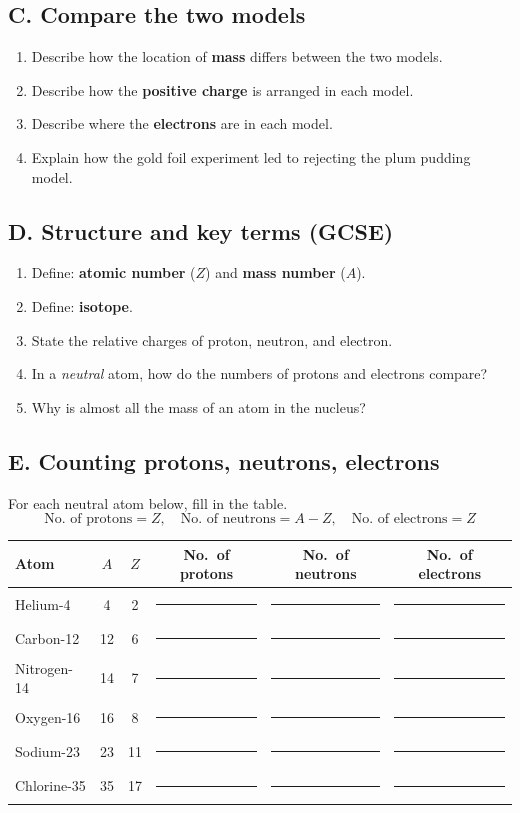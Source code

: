 \documentclass[11pt,a4paper]{article}
\begin{document}
\subsection*{C. Compare the two models}
\begin{enumerate}[resume]
  \item Describe how the location of \textbf{mass} differs between the two models.
  \item Describe how the \textbf{positive charge} is arranged in each model.
  \item Describe where the \textbf{electrons} are in each model.
  \item Explain how the gold foil experiment led to rejecting the plum pudding model.
\end{enumerate}

\subsection*{D. Structure and key terms (GCSE)}
\begin{enumerate}[resume]
  \item Define: \textbf{atomic number} ($Z$) and \textbf{mass number} ($A$).
  \item Define: \textbf{isotope}.
  \item State the relative charges of proton, neutron, and electron.
  \item In a \emph{neutral} atom, how do the numbers of protons and electrons compare?
  \item Why is almost all the mass of an atom in the nucleus?
\end{enumerate}

\newpage
\subsection*{E. Counting protons, neutrons, electrons}
For each neutral atom below, fill in the table.
\[
\text{No.\ of protons} = Z,\quad
\text{No.\ of neutrons} = A-Z,\quad
\text{No.\ of electrons} = Z
\]

\begin{center}
\begin{tabular}{@{}lccccc@{}}
\toprule
Atom & $A$ & $Z$ & No.\ of protons & No.\ of neutrons & No.\ of electrons \\
\midrule
Helium-4      & 4  & 2  & \rule{1cm}{0.4pt} & \rule{1cm}{0.4pt} & \rule{1cm}{0.4pt} \\
Carbon-12     & 12 & 6  & \rule{1cm}{0.4pt} & \rule{1cm}{0.4pt} & \rule{1cm}{0.4pt} \\
Nitrogen-14   & 14 & 7  & \rule{1cm}{0.4pt} & \rule{1cm}{0.4pt} & \rule{1cm}{0.4pt} \\
Oxygen-16     & 16 & 8  & \rule{1cm}{0.4pt} & \rule{1cm}{0.4pt} & \rule{1cm}{0.4pt} \\
Sodium-23     & 23 & 11 & \rule{1cm}{0.4pt} & \rule{1cm}{0.4pt} & \rule{1cm}{0.4pt} \\
Chlorine-35   & 35 & 17 & \rule{1cm}{0.4pt} & \rule{1cm}{0.4pt} & \rule{1cm}{0.4pt} \\
\bottomrule
\end{tabular}
\end{center}
\end{document}
